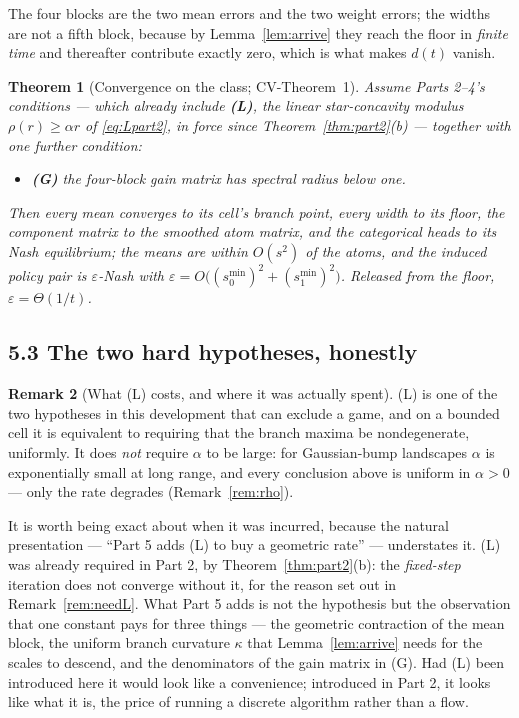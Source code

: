 \documentclass[11pt]{article}
\newtheorem{theorem}{Theorem}[section]
\theoremstyle{definition}
\newtheorem{remark}[theorem]{Remark}
\newcommand{\CV}[1]{\textsf{CV-#1}}
\begin{document}
The four blocks are the two mean errors and the two weight errors; the widths are
not a fifth block, because by Lemma~\ref{lem:arrive} they reach the floor in
\emph{finite time} and thereafter contribute exactly zero, which is what makes
$d(t)$ vanish.

\begin{theorem}[Convergence on the class; \CV{Theorem~1}]\label{thm:main}
Assume Parts 2--4's conditions --- which already include \textbf{(L)}, the linear
star-concavity modulus $\rho(r) \ge \alpha r$ of \eqref{eq:Lpart2}, in force since
Theorem~\ref{thm:part2}(b) --- together with one further condition:
\begin{itemize}[leftmargin=1.2em]
\item \textbf{(G)} the four-block gain matrix has spectral radius below one.
\end{itemize}
Then every mean converges to its cell's branch point, every width to its floor,
the component matrix to the smoothed atom matrix, and the categorical heads to its
Nash equilibrium; the means are within $O(s^2)$ of the atoms, and the induced
policy pair is $\varepsilon$-Nash with
$\varepsilon = O\big((s^{\min}_0)^2 + (s^{\min}_1)^2\big)$. Released from the
floor, $\varepsilon = \Theta(1/t)$.
\end{theorem}

\subsection*{5.3 The two hard hypotheses, honestly}

\begin{remark}[What (L) costs, and where it was actually spent]\label{rem:L}
(L) is one of the two hypotheses in this development that can exclude a game, and
on a bounded cell it is equivalent to requiring that the branch maxima be
nondegenerate, uniformly. It does \emph{not} require $\alpha$ to be large: for
Gaussian-bump landscapes $\alpha$ is exponentially small at long range, and every
conclusion above is uniform in $\alpha > 0$ --- only the rate degrades
(Remark~\ref{rem:rho}).

It is worth being exact about when it was incurred, because the natural
presentation --- ``Part 5 adds (L) to buy a geometric rate'' --- understates it.
(L) was already required in Part 2, by Theorem~\ref{thm:part2}(b): the
\emph{fixed-step} iteration does not converge without it, for the reason set out
in Remark~\ref{rem:needL}. What Part 5 adds is not the hypothesis but the
observation that one constant pays for three things --- the geometric contraction
of the mean block, the uniform branch curvature $\kappa$ that
Lemma~\ref{lem:arrive} needs for the scales to descend, and the denominators of
the gain matrix in (G). Had (L) been introduced here it would look like a
convenience; introduced in Part 2, it looks like what it is, the price of running
a discrete algorithm rather than a flow.
\end{remark}
\end{document}
